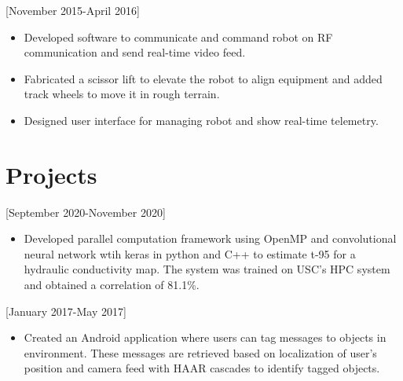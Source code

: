 \documentclass[10pt]{article}
\begin{document}
[November 2015-April 2016]

\begin{itemize}
\item Developed software to communicate and command robot on RF communication and send real-time video feed.
\item Fabricated a scissor lift to elevate the robot to align equipment and added track wheels to move it in rough terrain.
\item Designed user interface for managing robot and show real-time telemetry.
\end{itemize}




\section{Projects}

[September 2020-November 2020]
\begin{itemize}
    \item Developed parallel computation framework using OpenMP and convolutional neural network wtih keras in python and C++ to estimate t-95 for a hydraulic conductivity map. The system was trained on USC's HPC system and obtained a correlation of 81.1\%.
\end{itemize}

[January 2017-May 2017]
\begin{itemize}
    \item Created an Android application where users can tag messages to objects in environment. These messages are retrieved based on localization of user's position and camera feed with HAAR cascades to identify tagged objects.
\end{itemize}
\end{document}
